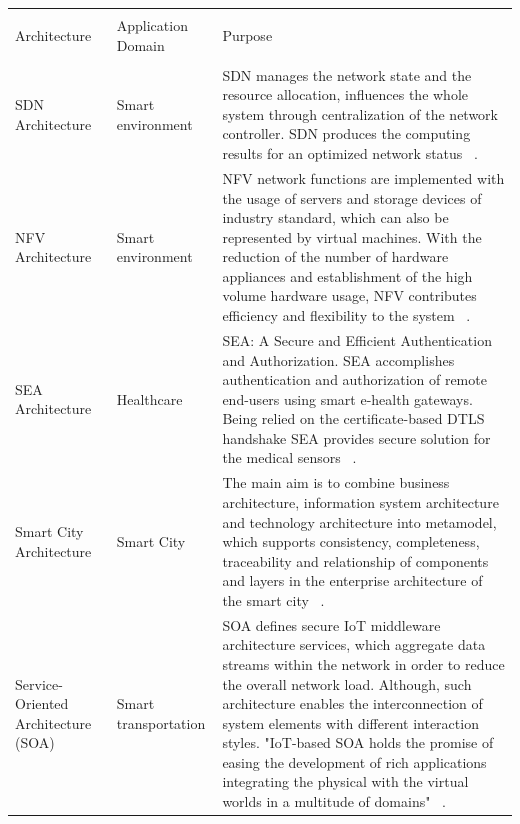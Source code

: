 \documentclass[12pt]{article}
\begin{document}
\newpage
\begin{center}
	\tiny
	\begin{longtable}{ p{4cm} p{3cm} p{7cm} }
		\hline\\
		Architecture & Application Domain & Purpose \\[6pt]
		\hline
		\\
		SDN Architecture & Smart environment & SDN manages the network state and the resource allocation, influences the whole system through centralization of the network controller. SDN produces the computing results for an optimized network status  ~\cite{SDN/NFV}. \\[6pt]
		
		NFV Architecture & Smart environment & NFV network functions are implemented with the usage of servers and storage devices of industry standard, which can also be represented by virtual machines. With the reduction of the number of hardware appliances and establishment of the  high volume hardware usage, NFV contributes efficiency and flexibility to the system  ~\cite{SDN/NFV}. \\[6pt]
		
		SEA Architecture & Healthcare & SEA: A Secure and Efficient Authentication and Authorization. SEA accomplishes authentication and authorization of remote end-users using smart e-health gateways. Being relied on the certificate-based DTLS handshake SEA provides secure solution for the medical sensors  ~\cite{SEA}.\\[6pt]
		
		Smart City Architecture & Smart City & The main aim is to combine business architecture, information system architecture and technology architecture into metamodel, which supports consistency, completeness, traceability and relationship of components and layers in the enterprise architecture of the smart city ~\cite{SmartC}.\\[6pt]
			
		Service-Oriented Architecture (SOA) & Smart transportation & SOA defines secure IoT middleware architecture services, which aggregate data streams within the network in order to reduce the overall network load. Although, such architecture enables the interconnection of system elements with different interaction styles. "IoT-based SOA holds the promise of easing the development of rich applications integrating the physical with the virtual worlds in a multitude of domains" ~\cite{SOA}.\\[6pt]
		

\end{longtable}
\end{center}
\end{document}
